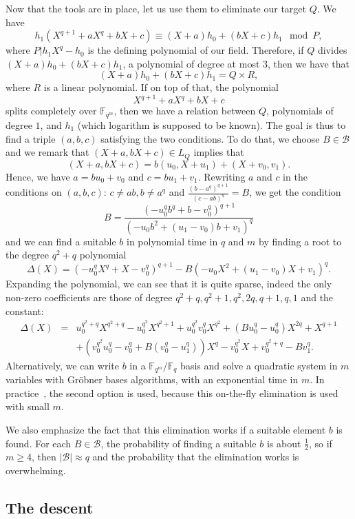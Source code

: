 \documentclass[a4paper,11pt]{article}
\theoremstyle{break}
\theoremstyle{sc}
\theoremstyle{definition}
\theoremstyle{remark}
\begin{document}
Now that the tools are in place, let us use them to eliminate our target
$Q$. We have
\[
  h_1(X^{q+1}+aX^q+bX+c)\equiv(X+a)h_0+(bX+c)h_1\mod P,
\]
where $P|h_1X^q-h_0$ is the defining polynomial of our field. Therefore,
if $Q$ divides $(X+a)h_0+(bX+c)h_1$, a polynomial of degree at most $3$, then we
have that
\[
  (X+a)h_0+(bX+c)h_1=Q\times R,
\]
where $R$ is a linear polynomial. If
on top of that, the polynomial 
\[
  X^{q+1}+aX^q+bX+c
\]
splits completely over
$\mathbb{F}_{q^m}$, then we have a relation between $Q$, polynomials of degree
$1$, and $h_1$ (which logarithm is supposed to be known). The goal is thus to
find a triple $(a, b, c)$ satisfying the two conditions. To do that, we choose
$B\in \mathcal B$ and we remark that $(X+a,
bX+c)\in L_Q$ implies that 
\[
  (X+a, bX+c)=b(u_0, X+u_1)+(X+v_0, v_1).
\]
Hence, we
have $a=bu_0+v_0$ and $c=bu_1+v_1$. Rewriting $a$ and $c$ in the conditions
on $(a,b,c)$: $c\neq ab,b\neq a^q$ and $\frac{(b-a^q)^{q+1}}{(c-ab)^q}=B$, we
get the condition
\[
  B = \frac{(-u_0^qb^q+b-v_0^q)^{q+1}}{(-u_0b^2+(u_1-v_0)b+v_1)^q}
\]
and we can find a suitable $b$ in polynomial time in $q$ and $m$ by finding a
root to the degree
$q^2+q$ polynomial
\[
  \Delta(X) = (-u_0^qX^q+X-v_0^q)^{q+1} - B(-u_0X^2+(u_1-v_0)X+v_1)^q.
\]
Expanding the polynomial, we can see that it is quite sparse, indeed the only
non-zero coefficients are those of degree $q^2+q, q^2+1, q^2, 2q, q+1, q, 1$ and
the constant:
\begin{eqnarray*}
  \Delta(X) &=&
  u_0^{q^2+q}X^{q^2+q}-u_0^{q^2}X^{q^2+1}+u_0^{q^2}v_0^qX^{q^2}+(Bu_0^q-u_0^q)X^{2q}+X^{q+1} \\
  & & +(v_0^{q^2}u_0^q-v_0^q+B(v_0^q-u_1^q))X^q-v_0^{q^2}X+v_0^{q^2+q}-Bv_1^q.
\end{eqnarray*}
Alternatively, we can write $b$ in a $\mathbb{F}_{q^m}/\mathbb{F}_q$
basis and solve a quadratic system in $m$ variables with Gröbner bases
algorithms, with an exponential time in $m$. In practice~\cite{Adj16}, the
second option is used, because this on-the-fly elimination is used with small $m$.

We also emphasize the fact that this elimination works if a suitable element
$b$ is found. For each $B\in\mathcal B$, the probability of finding a suitable
$b$ is about $\frac{1}{2}$, so if
$m\geq4$, then $|\mathcal B|\approx q$ and the probability that the
elimination works is overwhelming.

\subsection{The descent}
\end{document}
